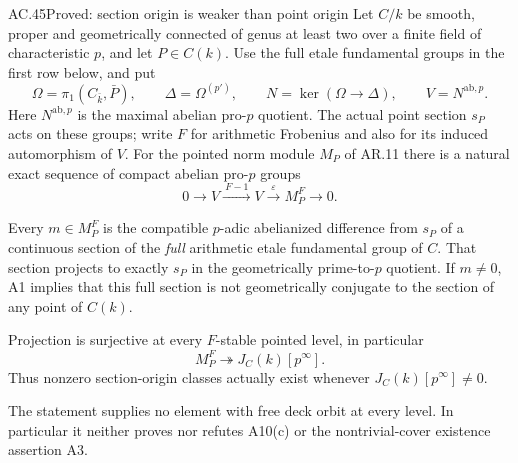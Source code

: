 \begin{claim}{AC.45}{Proved: section origin is weaker than point origin}
\label{clm:ACnormsectionorigin}
Let $C/k$ be smooth, proper and geometrically connected of genus
at least two over a finite field of characteristic $p$, and let
$P\in C(k)$. Use the full etale fundamental groups in the
first row below, and put
\[
 \Omega=\pi_1(C_{\bar k},\bar P),\qquad
 \Delta=\Omega^{(p')},\qquad
 N=\ker(\Omega\longrightarrow\Delta),\qquad
 V=N^{\mathrm{ab},p}.
                                                        \tag{AC.45.1}
\]
Here $N^{\mathrm{ab},p}$ is the maximal abelian pro-$p$
quotient. The actual point section $s_P$ acts on these
groups; write $F$ for arithmetic Frobenius and also for
its induced automorphism of $V$. For the pointed norm
module $M_P$ of AR.11 there is a natural exact sequence
of compact abelian pro-$p$ groups
\[
 0\longrightarrow V\xrightarrow{\ F-1\ }V
      \xrightarrow{\ \varepsilon\ }M_P^F
      \longrightarrow0.
                                                        \tag{AC.45.2}
\]

Every $m\in M_P^F$ is the compatible $p$-adic
abelianized difference from $s_P$ of a continuous section
of the \emph{full} arithmetic etale fundamental group
of $C$. That section projects to exactly $s_P$ in the
geometrically prime-to-$p$ quotient. If $m\ne0$, A1
implies that this full section is not geometrically
conjugate to the section of any point of $C(k)$.

Projection is surjective at every $F$-stable pointed
level, in particular
\[
                    M_P^F\twoheadrightarrow J_C(k)[p^\infty].
                                                        \tag{AC.45.8}
\]
Thus nonzero section-origin classes actually exist
whenever $J_C(k)[p^\infty]\ne0$.

The statement supplies no element with free deck orbit
at every level. In particular it neither proves nor
refutes A10(c) or the nontrivial-cover existence
assertion A3.
\end{claim}

